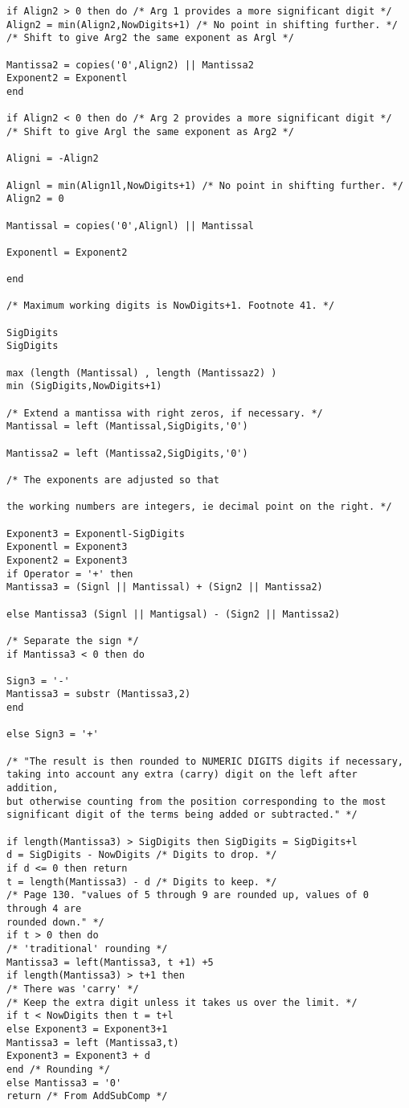 \begin{verbatim}
if Align2 > 0 then do /* Arg 1 provides a more significant digit */
Align2 = min(Align2,NowDigits+1) /* No point in shifting further. */
/* Shift to give Arg2 the same exponent as Argl */

Mantissa2 = copies('0',Align2) || Mantissa2
Exponent2 = Exponentl
end

if Align2 < 0 then do /* Arg 2 provides a more significant digit */
/* Shift to give Argl the same exponent as Arg2 */

Aligni = -Align2

Alignl = min(Align1l,NowDigits+1) /* No point in shifting further. */
Align2 = 0

Mantissal = copies('0',Alignl) || Mantissal

Exponentl = Exponent2

end

/* Maximum working digits is NowDigits+1. Footnote 41. */

SigDigits
SigDigits

max (length (Mantissal) , length (Mantissaz2) )
min (SigDigits,NowDigits+1)

/* Extend a mantissa with right zeros, if necessary. */
Mantissal = left (Mantissal,SigDigits,'0')

Mantissa2 = left (Mantissa2,SigDigits,'0')

/* The exponents are adjusted so that

the working numbers are integers, ie decimal point on the right. */

Exponent3 = Exponentl-SigDigits
Exponentl = Exponent3
Exponent2 = Exponent3
if Operator = '+' then
Mantissa3 = (Signl || Mantissal) + (Sign2 || Mantissa2)

else Mantissa3 (Signl || Mantigsal) - (Sign2 || Mantissa2)

/* Separate the sign */
if Mantissa3 < 0 then do

Sign3 = '-'
Mantissa3 = substr (Mantissa3,2)
end

else Sign3 = '+'

/* "The result is then rounded to NUMERIC DIGITS digits if necessary,
taking into account any extra (carry) digit on the left after addition,
but otherwise counting from the position corresponding to the most
significant digit of the terms being added or subtracted." */

if length(Mantissa3) > SigDigits then SigDigits = SigDigits+l
d = SigDigits - NowDigits /* Digits to drop. */
if d <= 0 then return
t = length(Mantissa3) - d /* Digits to keep. */
/* Page 130. "values of 5 through 9 are rounded up, values of 0 through 4 are
rounded down." */
if t > 0 then do
/* 'traditional' rounding */
Mantissa3 = left(Mantissa3, t +1) +5
if length(Mantissa3) > t+1 then
/* There was 'carry' */
/* Keep the extra digit unless it takes us over the limit. */
if t < NowDigits then t = t+l
else Exponent3 = Exponent3+1
Mantissa3 = left (Mantissa3,t)
Exponent3 = Exponent3 + d
end /* Rounding */
else Mantissa3 = '0'
return /* From AddSubComp */


\end{verbatim}
